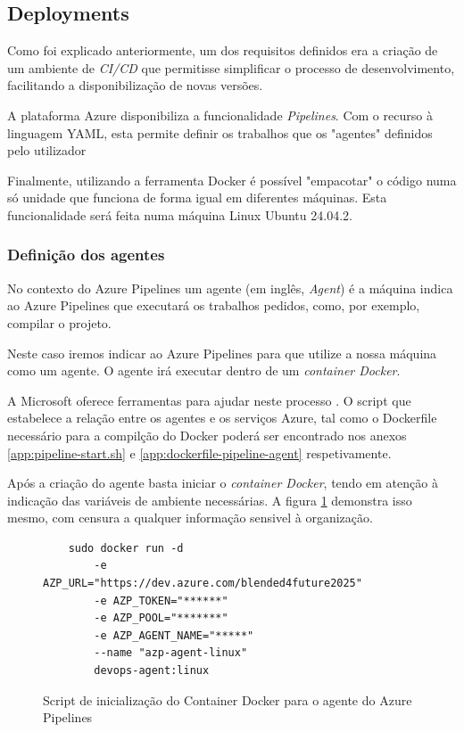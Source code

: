 \subsection{Deployments}

Como foi explicado anteriormente, um dos requisitos definidos  era a criação de um ambiente de \textit{CI/CD} que permitisse simplificar o processo de desenvolvimento, facilitando a disponibilização de novas versões.

A plataforma Azure disponibiliza a funcionalidade \textit{Pipelines}. Com o recurso à linguagem YAML, esta permite definir os trabalhos que os "agentes" definidos pelo utilizador

Finalmente, utilizando a ferramenta Docker é possível "empacotar" o código numa só unidade que funciona de forma igual em diferentes máquinas. Esta funcionalidade será feita numa máquina Linux Ubuntu 24.04.2. 

\subsubsection{Definição dos agentes}

No contexto do Azure Pipelines um agente (em inglês, \textit{Agent}) é a máquina indica ao Azure Pipelines que executará os trabalhos pedidos, como, por exemplo, compilar o projeto. 

Neste caso iremos indicar ao Azure Pipelines para que utilize a nossa máquina como um agente. O agente irá executar dentro de um \textit{container Docker}.

A Microsoft oferece ferramentas para ajudar neste processo \cite{run-a-self-hosted-agent-in-docker}. O script que estabelece a relação entre os agentes e os serviços Azure, tal como o Dockerfile necessário para a compilção do Docker poderá ser encontrado nos anexos \ref{app:pipeline-start.sh} e \ref{app:dockerfile-pipeline-agent} respetivamente.

Após a criação do agente basta iniciar o \textit{container Docker}, tendo em atenção à indicação das variáveis de ambiente necessárias. A figura \ref{fig:start-docker-agent} demonstra isso mesmo, com censura a qualquer informação sensivel à organização.

\begin{figure}[h!tbp]
    

\begin{lstlisting}
    sudo docker run -d 
        -e AZP_URL="https://dev.azure.com/blended4future2025" 
        -e AZP_TOKEN="******" 
        -e AZP_POOL="*******" 
        -e AZP_AGENT_NAME="*****" 
        --name "azp-agent-linux" 
        devops-agent:linux
\end{lstlisting}


\caption{Script de inicialização do Container Docker para o agente do Azure Pipelines}
\label{fig:start-docker-agent}

\end{figure}

